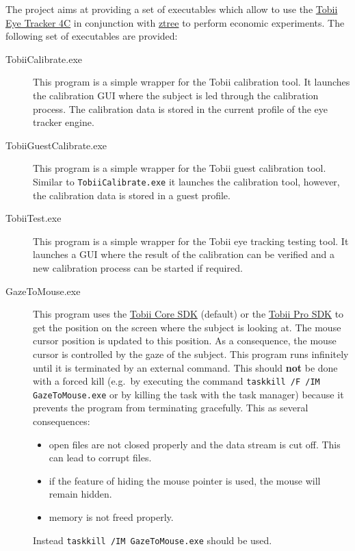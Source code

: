 \documentclass[a4paper,oneside]{book}
\begin{document}
The project aims at providing a set of executables which allow to use the \href{https://tobiigaming.com/eye-tracker-4c/}{Tobii Eye Tracker 4C} in conjunction with \href{http://www.ztree.uzh.ch/en.html}{ztree} to perform economic experiments.
The following set of executables are provided:
\begin{description}
    \item[TobiiCalibrate.exe] This program is a simple wrapper for the Tobii calibration tool.
        It launches the calibration GUI where the subject is led through the calibration process.
        The calibration data is stored in the current profile of the eye tracker engine.
    \item[TobiiGuestCalibrate.exe] This program is a simple wrapper for the Tobii guest calibration tool.
        Similar to \texttt{TobiiCalibrate.exe} it launches the calibration tool, however, the calibration data is stored in a guest profile.
    \item[TobiiTest.exe] This program is a simple wrapper for the Tobii eye tracking testing tool.
        It launches a GUI where the result of the calibration can be verified and a new calibration process can be started if required.
    \item[GazeToMouse.exe] This program uses the \href{http://developer.tobii.com/tobii-core-sdk/}{Tobii Core SDK} (default) or the \href{http://developer.tobii.com/tobii-pro-sdk/}{Tobii Pro SDK} to get the position on the screen where the subject is looking at.
        The mouse cursor position is updated to this position.
        As a consequence, the mouse cursor is controlled by the gaze of the subject.
        This program runs infinitely until it is terminated by an external command.
        This should \textbf{not} be done with a forced kill (e.g.~by executing the command \texttt{taskkill /F /IM GazeToMouse.exe} or by killing the task with the task manager) because it prevents the program from terminating gracefully.
        This as several consequences:
        \begin{itemize}
            \item open files are not closed properly and the data stream is cut off. This can lead to corrupt files.
            \item if the feature of hiding the mouse pointer is used, the mouse will remain hidden.
            \item memory is not freed properly.
        \end{itemize}
        Instead \texttt{taskkill /IM GazeToMouse.exe} should be used.

\end{description}
\end{document}
